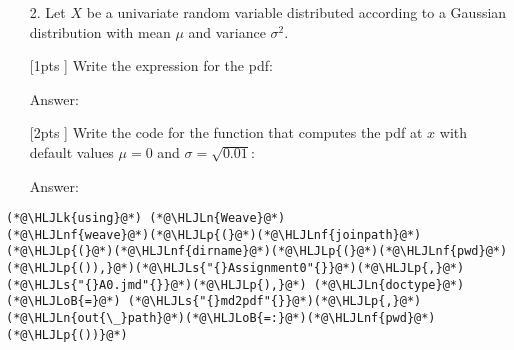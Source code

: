 \documentclass[12pt,a4paper]{article}
\newcommand{\HLJLk}[1]{\textcolor[RGB]{148,91,176}{\textbf{#1}}}
\newcommand{\HLJLn}[1]{#1}
\newcommand{\HLJLnf}[1]{\textcolor[RGB]{66,102,213}{#1}}
\newcommand{\HLJLs}[1]{\textcolor[RGB]{201,61,57}{#1}}
\newcommand{\HLJLoB}[1]{\textcolor[RGB]{102,102,102}{\textbf{#1}}}
\newcommand{\HLJLp}[1]{#1}
\begin{document}
\begin{itemize}
\item[2. ] Let $X$ be a univariate random variable distributed according to a Gaussian distribution with mean $\mu$ and variance $\sigma^2$.

\end{itemize}
\begin{itemize}
\item [[1pts]] Write the expression for the pdf:

Answer:


\item [[2pts]] Write the code for the function that computes the pdf at $x$ with default values $\mu=0$ and $\sigma = \sqrt{0.01}$:

Answer:

\end{itemize}


\begin{lstlisting}
(*@\HLJLk{using}@*) (*@\HLJLn{Weave}@*)
(*@\HLJLnf{weave}@*)(*@\HLJLp{(}@*)(*@\HLJLnf{joinpath}@*)(*@\HLJLp{(}@*)(*@\HLJLnf{dirname}@*)(*@\HLJLp{(}@*)(*@\HLJLnf{pwd}@*)(*@\HLJLp{()),}@*)(*@\HLJLs{"{}Assignment0"{}}@*)(*@\HLJLp{,}@*)(*@\HLJLs{"{}A0.jmd"{}}@*)(*@\HLJLp{),}@*) (*@\HLJLn{doctype}@*) (*@\HLJLoB{=}@*) (*@\HLJLs{"{}md2pdf"{}}@*)(*@\HLJLp{,}@*) (*@\HLJLn{out{\_}path}@*)(*@\HLJLoB{=:}@*)(*@\HLJLnf{pwd}@*)(*@\HLJLp{())}@*)
\end{lstlisting}
\end{document}
